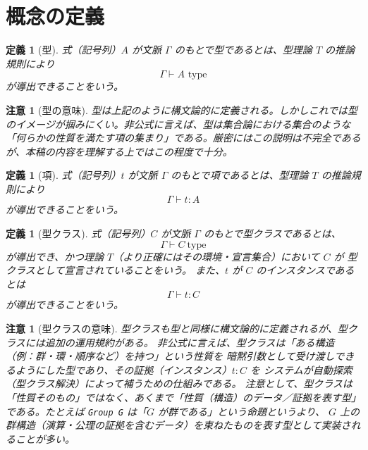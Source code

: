 \documentclass[a4paper,12pt]{bxjsbook}
\theoremstyle{theorem}
\newtheorem{definition}[theorem]{定義}
\newtheorem{remark}[theorem]{注意}
\begin{document}
    \section{概念の定義}
    \begin{definition}[型]
        式（記号列）$A$ が文脈 $\Gamma$ のもとで型であるとは、型理論 $T$ の推論規則により
        \[
        \Gamma \vdash A \text{ type}
        \]
        が導出できることをいう。
    \end{definition}

    \begin{remark}[型の意味]
        型は上記のように構文論的に定義される。しかしこれでは型のイメージが掴みにくい。非公式に言えば、型は集合論における集合のような「何らかの性質を満たす項の集まり」である。厳密にはこの説明は不完全であるが、本稿の内容を理解する上ではこの程度で十分。
    \end{remark}

    \begin{definition}[項]
        式（記号列）$t$ が文脈 $\Gamma$ のもとで項であるとは、型理論 $T$ の推論規則により
        \[
        \Gamma \vdash t : A
        \]
        が導出できることをいう。
    \end{definition}

    \begin{definition}[型クラス]
        式（記号列）$C$ が文脈 $\Gamma$ のもとで型クラスであるとは、
        \[
        \Gamma \vdash C\ \text{type}
        \]
        が導出でき、かつ理論 $T$（より正確にはその環境・宣言集合）において $C$ が \emph{型クラスとして宣言されている}ことをいう。
        また、$t$ が $C$ の\emph{インスタンス}であるとは
        \[
        \Gamma \vdash t : C
        \]
        が導出できることをいう。
    \end{definition}

    \begin{remark}[型クラスの意味]
        型クラスも型と同様に構文論的に定義されるが、型クラスには追加の運用規約がある。
        非公式に言えば、型クラスは「ある構造（例：群・環・順序など）を持つ」という性質を \emph{暗黙引数として受け渡し}できるようにした型であり、その証拠（インスタンス）$t:C$ を システムが自動探索（型クラス解決）によって補うための仕組みである。
        注意として、型クラスは「性質そのもの」ではなく、あくまで「性質（構造）のデータ／証拠を表す型」 である。たとえば \texttt{Group G} は「$G$ が群である」という命題というより、 $G$ 上の群構造（演算・公理の証拠を含むデータ）を束ねたものを表す型として実装されることが多い。
    \end{remark}
\end{document}
